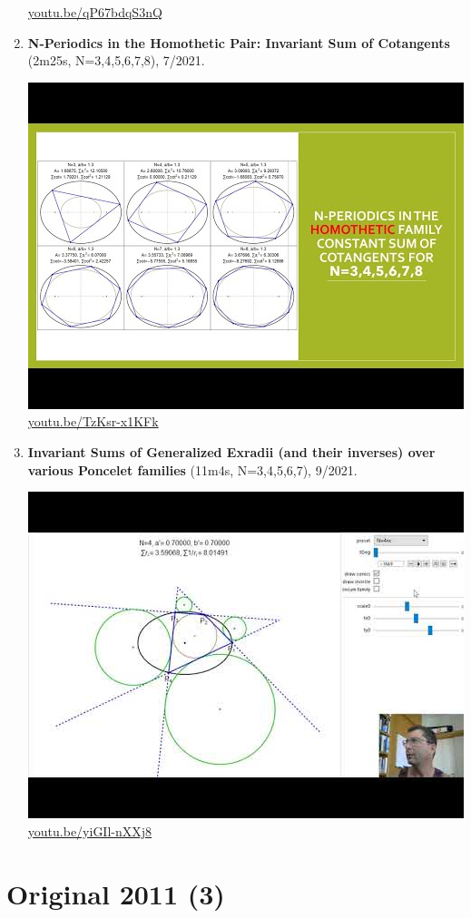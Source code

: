 \documentclass[12pt]{amsart}
\begin{document}
\begin{enumerate}[resume]
\begin{center}
\href{https://youtu.be/qP67bdqS3nQ}{\url{youtu.be/qP67bdqS3nQ}}\end{center}
% 
\item \textbf{N-Periodics in the Homothetic Pair: Invariant Sum of Cotangents} (2m25s, N=3,4,5,6,7,8), 7/2021. 
\begin{center}\includegraphics[width=.5\textwidth]{pics/TzKsr-x1KFk.jpg} \\ 
\href{https://youtu.be/TzKsr-x1KFk}{\url{youtu.be/TzKsr-x1KFk}}\end{center}
% 
\item \textbf{Invariant Sums of Generalized Exradii (and their inverses) over various Poncelet families} (11m4s, N=3,4,5,6,7), 9/2021. 
\begin{center}\includegraphics[width=.5\textwidth]{pics/yiGIl-nXXj8.jpg} \\ 
\href{https://youtu.be/yiGIl-nXXj8}{\url{youtu.be/yiGIl-nXXj8}}\end{center}
% 
\end{enumerate}

\section{Original 2011 (3)}
\end{document}
